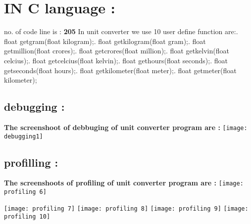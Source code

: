 \documentclass[12pt,a10paper]{report}
\begin{document}
\section{\textbf{IN C language :}}
\large{no. of code line is : {\textbf{205}}
In unit converter we use 10 user define function are:\newline{}. float getgram(float kilogram);\newline{}. float getkilogram(float gram);\newline{}. float getmillion(float crores);\newline{}. float getcrores(float million);\newline{}. float getkelvin(float celcius);\newline{}. float getcelcius(float kelvin);\newline{}. float gethours(float seconds);\newline{}. float getseconds(float hours);\newline{}. float getkilometer(float meter);\newline{}. float getmeter(float kilometer); \newline\newline
\pagebreak
\graphicspath{{./deepikamandroniyahp/} }
\subsection{debugging :}
\textbf{The screenshoot of debbuging of unit converter program are :}\newline\newline
\texttt{[image: debugging1]}
\pagebreak
\subsection{profilling :}
\textbf{The screenshoots of profiling of unit converter program are :}\newline\newline
\texttt{[image: profiling 6]}

\texttt{[image: profiling 7]}
\texttt{[image: profiling 8]}
\texttt{[image: profiling 9]}
\texttt{[image: profiling 10]}
\pagebreak
}
\end{document}
